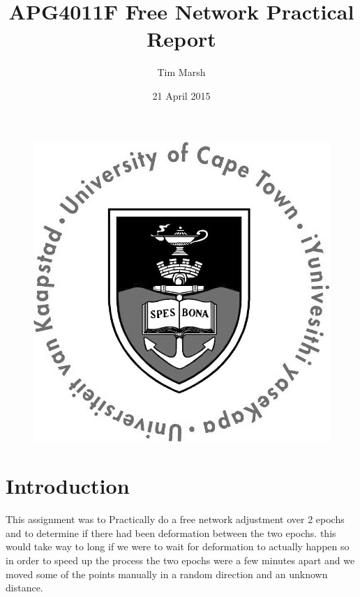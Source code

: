 \documentclass[11pt,a4paper]{article}
\title{APG4011F Free Network Practical Report}
\date{21 April 2015}
\author{Tim Marsh}
\begin{document}
	
	\maketitle
	\begin{figure}[H]
		\centering
		\includegraphics[width=0.7\linewidth]{images/UCTcircular_logo1_CMYK}
		\label{fig:UCTcircular_logo1_CMYK}
	\end{figure}
	\newpage
	\tableofcontents
	\newpage
	
	
	\section{Introduction}
	
	This assignment was to Practically do a free network adjustment over 2 epochs and to determine if there had been deformation between the two epochs. this would take way to long if we were to wait for deformation to actually happen so in order to speed up the process the two epochs were a few minutes apart and we moved some of the points manually in a random direction and an unknown distance.
	
\end{document}

